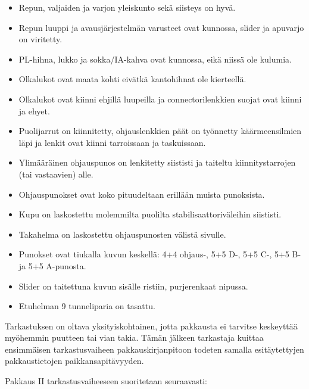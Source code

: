 \begin{itemize}
\item  Repun, valjaiden ja varjon yleiskunto sekä siisteys on hyvä. 
\item  Repun luuppi ja avausjärjestelmän varusteet ovat kunnossa, slider ja apuvarjo on viritetty. 
\item  PL-hihna, lukko ja sokka/IA-kahva ovat kunnossa, eikä niissä ole kulumia. 
\item  Olkalukot ovat maata kohti eivätkä kantohihnat ole kierteellä. 
\item  Olkalukot ovat kiinni ehjillä luupeilla ja connectorilenkkien suojat ovat kiinni ja ehyet. 
\item  Puolijarrut on kiinnitetty, ohjauslenkkien päät on työnnetty käärmeensilmien läpi ja lenkit ovat kiinni tarroissaan ja taskuissaan. 
\item  Ylimääräinen ohjauspunos on lenkitetty siististi ja taiteltu kiinnitystarrojen (tai vastaavien) alle. 
\item  Ohjauspunokset ovat koko pituudeltaan erillään muista punoksista. 
\item  Kupu on laskostettu molemmilta puolilta stabilisaattoriväleihin siististi. 
\item  Takahelma on laskostettu ohjauspunosten välistä sivulle. 
\item  Punokset ovat tiukalla kuvun keskellä: 4+4 ohjaus\mbox{-,} 5+5 D\mbox{-,} 5+5 C\mbox{-,} 5+5 B- ja 5+5 A-punosta. 
\item  Slider on taitettuna kuvun sisälle ristiin, purjerenkaat nipussa. 
\item  Etuhelman 9 tunneliparia on tasattu. 
\end{itemize}

Tarkastuksen on oltava yksityiskohtainen, jotta pakkausta ei tarvitse keskeyttää myöhemmin puutteen tai vian takia. Tämän jälkeen tarkastaja kuittaa ensimmäisen tarkastusvaiheen pakkauskirjanpitoon todeten samalla esitäytettyjen pakkaustietojen paikkansapitävyyden. 


Pakkaus II tarkastusvaiheeseen suoritetaan seuraavasti: 

